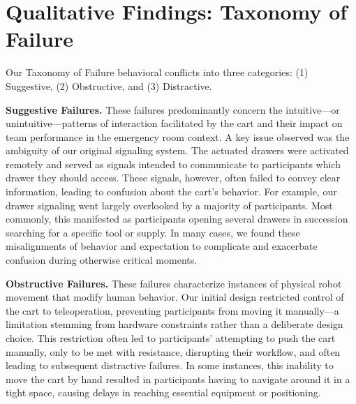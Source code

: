 \section{Qualitative Findings: Taxonomy of Failure}
\label{sec:qual_results}

Our Taxonomy of Failure behavioral conflicts into three categories: (1) Suggestive, (2) Obstructive, and (3) Distractive.

\textbf{Suggestive Failures.} These failures predominantly concern the intuitive—or unintuitive—patterns of interaction facilitated by the cart and their impact on team performance in the emergency room context. 
A key issue observed was the ambiguity of our original signaling system. 
The actuated drawers were activated remotely and served as signals intended to communicate to participants which drawer they should access. %
These signals, however, often failed to convey clear information, leading to confusion about the cart’s behavior. 
For example, our drawer signaling went largely overlooked by a majority of participants. 
Most commonly, this manifested as participants opening several drawers in succession searching for a specific tool or supply. 
In many cases, we found these misalignments of behavior and expectation to complicate and exacerbate confusion during otherwise critical moments.

\textbf{Obstructive Failures.} These failures characterize instances of physical robot movement that modify human behavior. %
Our initial design restricted control of the cart to teleoperation, preventing participants from moving it manually—a limitation stemming from hardware constraints rather than a deliberate design choice. 
This restriction often led to participants' attempting to push the cart manually, only to be met with resistance, disrupting their workflow, and often leading to subsequent distractive failures. 
In some instances, this inability to move the cart by hand resulted in participants having to navigate around it in a tight space, causing delays in reaching essential equipment or positioning. 

